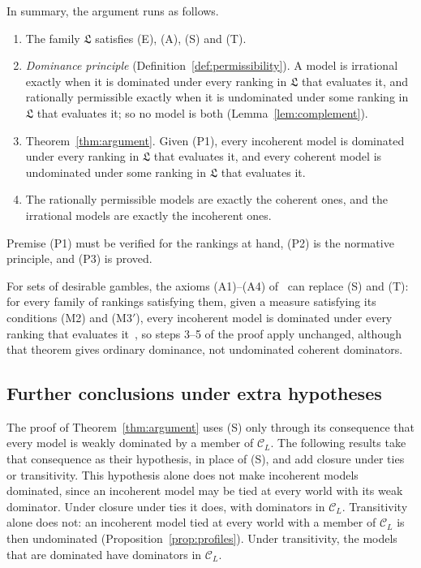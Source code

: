 \documentclass[11pt]{article}
\theoremstyle{definition}
\newcommand{\C}{\mathcal C}
\newcommand{\Lf}{\mathfrak L}
\begin{document}
In summary, the argument runs as follows.
\begin{enumerate}[label=\textbf{(P\arabic*)},leftmargin=*]
\item The family $\Lf$ satisfies (E), (A), (S) and (T).
\item \emph{Dominance principle} (Definition~\ref{def:permissibility}). A model is irrational exactly when it is dominated under every ranking in $\Lf$ that evaluates it, and rationally permissible exactly when it is undominated under some ranking in $\Lf$ that evaluates it; so no model is both (Lemma~\ref{lem:complement}).
\item Theorem~\ref{thm:argument}. Given (P1), every incoherent model is dominated under every ranking in $\Lf$ that evaluates it, and every coherent model is undominated under some ranking in $\Lf$ that evaluates it.
\item[\textbf{(C)}] The rationally permissible models are exactly the coherent ones, and the irrational models are exactly the incoherent ones.
\end{enumerate}
Premise (P1) must be verified for the rankings at hand, (P2) is the normative principle, and (P3) is proved.

For sets of desirable gambles, the axioms (A1)--(A4) of~\cite{Konek2026} can replace (S) and (T): for every family of rankings satisfying them, given a measure satisfying its conditions (M2) and (M3$'$), every incoherent model is dominated under every ranking that evaluates it~\cite[Theorem~4.1]{Konek2026}, so steps 3--5 of the proof apply unchanged, although that theorem gives ordinary dominance, not undominated coherent dominators.

\subsection{Further conclusions under extra hypotheses}
The proof of Theorem~\ref{thm:argument} uses (S) only through its consequence that every model is weakly dominated by a member of $\C_L$. The following results take that consequence as their hypothesis, in place of (S), and add closure under ties or transitivity. This hypothesis alone does not make incoherent models dominated, since an incoherent model may be tied at every world with its weak dominator. Under closure under ties it does, with dominators in $\C_L$. Transitivity alone does not: an incoherent model tied at every world with a member of $\C_L$ is then undominated (Proposition~\ref{prop:profiles}). Under transitivity, the models that are dominated have dominators in $\C_L$.
\end{document}

